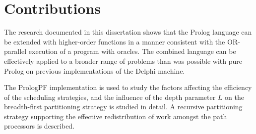 \section{Contributions} %

The research documented in this dissertation shows that the Prolog
language can be extended with higher-order functions in a manner
consistent with the OR-parallel execution of a program with oracles.
The combined language can be effectively
applied to a broader range of problems than was possible with pure
Prolog on previous implementations of the Delphi machine.

The PrologPF 
implementation is used to study the factors affecting the efficiency of the
scheduling strategies, and the influence of the depth parameter $L$ on the
breadth-first partitioning strategy is studied in detail.  A recursive
partitioning strategy supporting the effective redistribution of work amongst
the path processors is described.

